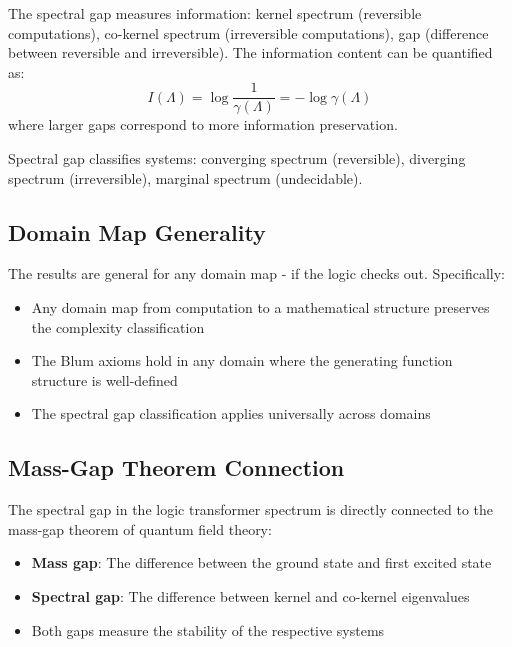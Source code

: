 \begin{definition}
\label{def:spectral-gap-info}
The spectral gap measures information: kernel spectrum (reversible computations), co-kernel spectrum (irreversible computations), gap (difference between reversible and irreversible). The information content can be quantified as:
\[
I(\Lambda) = \log \frac{1}{\gamma(\Lambda)} = -\log \gamma(\Lambda)
\]
where larger gaps correspond to more information preservation.
\end{definition}

\begin{theorem}
\label{thm:info-classification}
Spectral gap classifies systems: converging spectrum (reversible), diverging spectrum (irreversible), marginal spectrum (undecidable).
\end{theorem}

\subsection{Domain Map Generality}

\begin{theorem}
\label{thm:domain-generality-spectral}
The results are general for any domain map - if the logic checks out. Specifically:
\begin{itemize}
\item Any domain map from computation to a mathematical structure preserves the complexity classification
\item The Blum axioms hold in any domain where the generating function structure is well-defined
\item The spectral gap classification applies universally across domains
\end{itemize}
\end{theorem}

\subsection{Mass-Gap Theorem Connection}

\begin{remark}
\label{rem:mass-gap-spectral}
The spectral gap in the logic transformer spectrum is directly connected to the mass-gap theorem of quantum field theory:
\begin{itemize}
\item \textbf{Mass gap}: The difference between the ground state and first excited state
\item \textbf{Spectral gap}: The difference between kernel and co-kernel eigenvalues
\item Both gaps measure the stability of the respective systems
\end{itemize}
\end{remark}

